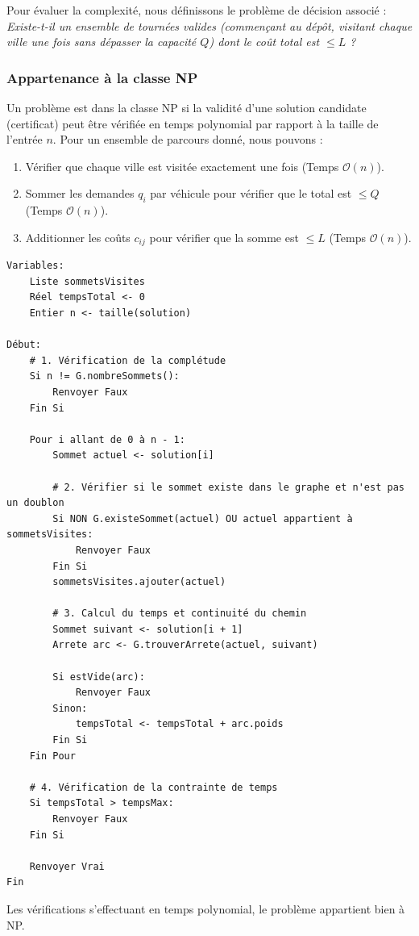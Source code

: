 Pour évaluer la complexité, nous définissons le problème de décision associé : \\
\textit{Existe-t-il un ensemble de tournées valides (commençant au dépôt, visitant chaque ville une fois sans dépasser la capacité $Q$) dont le coût total est $\leq L$ ?}

\subsubsection*{Appartenance à la classe NP}
{}

Un problème est dans la classe NP si la validité d'une solution candidate (certificat) peut être vérifiée en temps polynomial par rapport à la taille de l'entrée $n$.
Pour un ensemble de parcours donné, nous pouvons :
\begin{enumerate}
    \item Vérifier que chaque ville est visitée exactement une fois (Temps $\mathcal{O}(n)$).
    \item Sommer les demandes $q_i$ par véhicule pour vérifier que le total est $\leq Q$ (Temps $\mathcal{O}(n)$).
    \item Additionner les coûts $c_{ij}$ pour vérifier que la somme est $\leq L$ (Temps $\mathcal{O}(n)$).
\end{enumerate}


\begin{minipage}{\linewidth }
\begin{lstlisting}[caption={Algorithme de vérification de solution}]
Variables:
    Liste sommetsVisites
    Réel tempsTotal <- 0
    Entier n <- taille(solution)

Début:
    # 1. Vérification de la complétude
    Si n != G.nombreSommets():
        Renvoyer Faux
    Fin Si

    Pour i allant de 0 à n - 1:
        Sommet actuel <- solution[i]

        # 2. Vérifier si le sommet existe dans le graphe et n'est pas un doublon
        Si NON G.existeSommet(actuel) OU actuel appartient à sommetsVisites:
            Renvoyer Faux
        Fin Si
        sommetsVisites.ajouter(actuel)

        # 3. Calcul du temps et continuité du chemin
        Sommet suivant <- solution[i + 1]
        Arrete arc <- G.trouverArrete(actuel, suivant)

        Si estVide(arc):
            Renvoyer Faux
        Sinon:
            tempsTotal <- tempsTotal + arc.poids
        Fin Si
    Fin Pour

    # 4. Vérification de la contrainte de temps
    Si tempsTotal > tempsMax:
        Renvoyer Faux
    Fin Si

    Renvoyer Vrai
Fin
\end{lstlisting}
\end{minipage}
Les vérifications s'effectuant en temps polynomial, le problème appartient bien à NP.

